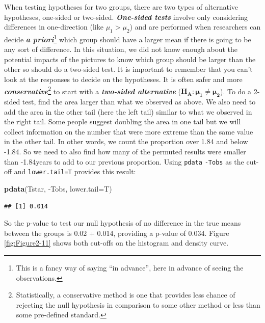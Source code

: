\documentclass[]{book}
\newenvironment{Shaded}{\begin{snugshade}}{\end{snugshade}}
\newcommand{\KeywordTok}[1]{\textcolor[rgb]{0.13,0.29,0.53}{\textbf{{#1}}}}
\newcommand{\DataTypeTok}[1]{\textcolor[rgb]{0.13,0.29,0.53}{{#1}}}
\newcommand{\NormalTok}[1]{{#1}}
\let\rmarkdownfootnote\footnote%
\def\footnote{\protect\rmarkdownfootnote}
\begin{document}
When testing hypotheses for two groups, there are two types of
alternative hypotheses, one-sided or two-sided. \textbf{\emph{One-sided
tests}} involve only considering differences in one-direction (like
\(\mu_1 > \mu_2\)) and are performed when researchers can decide
\textbf{\emph{a priori}}\footnote{This is a fancy way of saying ``in
  advance'', here in advance of seeing the observations.} which group
should have a larger mean if there is going to be any sort of
difference. In this situation, we did not know enough about the
potential impacts of the pictures to know which group should be larger
than the other so should do a two-sided test. It is important to
remember that you can't look at the responses to decide on the
hypotheses. It is often safer and more
\textbf{\emph{conservative}}\footnote{Statistically, a conservative
  method is one that provides less chance of rejecting the null
  hypothesis in comparison to some other method or less than some
  pre-defined standard.} to start with a \textbf{\emph{two-sided
alternative}} (\(\mathbf{H_A: \mu_1 \ne \mu_2}\)). To do a 2-sided test,
find the area larger than what we observed as above. We also need to add
the area in the other tail (here the left tail) similar to what we
observed in the right tail. Some people suggest doubling the area in one
tail but we will collect information on the number that were more
extreme than the same value in the other tail. In other words, we count
the proportion over 1.84 and below -1.84. So we need to also find how
many of the permuted results were smaller than -1.84years to add to our
previous proportion. Using \texttt{pdata} \texttt{-Tobs} as the cut-off
and \texttt{lower.tail=T} provides this result:

\begin{Shaded}
\begin{Highlighting}[]
\KeywordTok{pdata}\NormalTok{(Tstar, -Tobs, }\DataTypeTok{lower.tail=}\NormalTok{T)}
\end{Highlighting}
\end{Shaded}

\begin{verbatim}
## [1] 0.014
\end{verbatim}

So the p-value to test our null hypothesis of no difference in the true
means between the groups is 0.02 + 0.014, providing a p-value of 0.034.
Figure \ref{fig:Figure2-11} shows both cut-offs on the histogram and
density curve.
\end{document}
